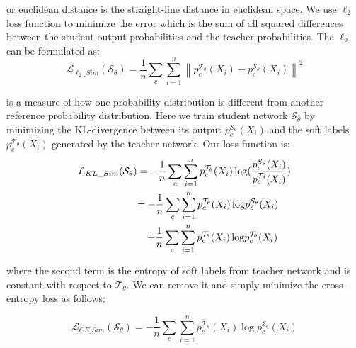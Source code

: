 \documentclass[letterpaper]{article} %
\newcommand{\LL}{\mathcal{L}}
\begin{document}
 or euclidean distance is the straight-line distance in euclidean space. We use $\ell_2$ loss function to minimize the error which is the sum of all squared differences between the student output probabilities and the teacher probabilities. The $\ell_2$ can be formulated as:
\begin{equation}
\LL_{\ell_2\_Sim}({\mathcal{S}_\theta }) = \frac{1}{n}\sum\limits_c {\sum\limits_{i = 1}^n {{{\left\| {p_c^{\mathcal{T}_\theta }({X_i}) - p_c^{\mathcal{S}_\theta }({X_i})} \right\|}^2}}} 
\end{equation}

 is a measure of how one probability distribution is different from another reference probability distribution. Here we train student network $\mathcal{S}_\theta$ by minimizing the KL-divergence between its output $p_c^{{\mathcal S}_\theta}({X_i})$ and the soft labels $p_c^{{\mathcal T}_\theta}({X_i})$ generated by the teacher network. Our loss function is:
\begin{equation}
\begin{gathered}
{\LL_{KL\_Sim}}({\mathcal{S}_\theta }) =  - \frac{1}{n}\sum\limits_c {\sum\limits_{i = 1}^n {p_c^{{\mathcal{T}_\theta }}({X_i})\log (\frac{{p_c^{{S_\theta }}({X_i})}}{{p_c^{{\mathcal{T}_\theta }}({X_i})}})} }  \hfill \\
\quad \quad \quad  \quad \quad \quad    =  - \frac{1}{n}\sum\limits_c {\sum\limits_{i = 1}^n {p_c^{{\mathcal{T}_\theta }}({X_i})\log } } p_c^{{\mathcal{S}_\theta }}({X_i}) \hfill \\
\quad \quad \quad  \quad \quad \quad \quad  + \frac{1}{n}\sum\limits_c {\sum\limits_{i = 1}^n {p_c^{{\mathcal{T}_\theta }}({X_i})\log } } p_c^{{\mathcal{T}_\theta }}({X_i}) \hfill \\ 
\end{gathered} 
\end{equation}

where the second term is the entropy of soft labels from teacher network and is constant with respect to $\mathcal{T}_\theta$. We can remove it and simply minimize the cross-entropy loss as follows:

\begin{equation}
{{{\LL}}_{CE\_Sim}}({\mathcal{S}_\theta }) =  - \frac{1}{n}\sum\limits_c {\sum\limits_{i = 1}^n {p_c^{{\mathcal{T}_\theta }}({X_i})\log } } p_c^{{\mathcal{S}_\theta }}({X_i})
\end{equation}
\end{document}
